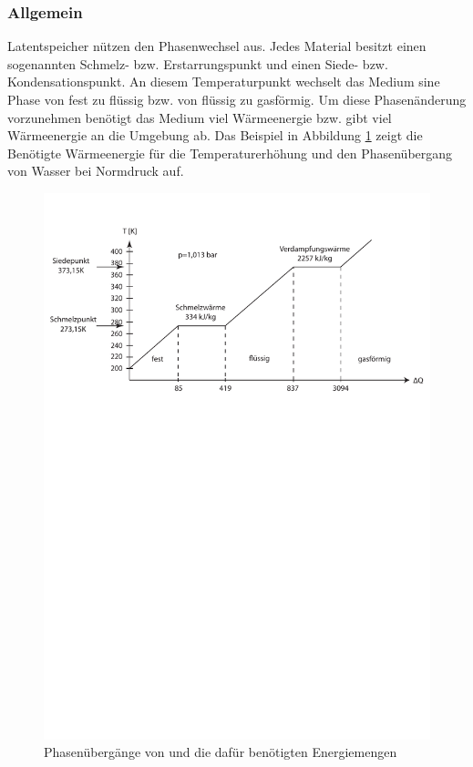 \documentclass[11pt,a4paper]{scrartcl}
\begin{document}
\subsubsection{Allgemein}
Latentspeicher nützen den Phasenwechsel aus. Jedes Material besitzt einen
sogenannten Schmelz- bzw. Erstarrungspunkt und einen Siede- bzw.
Kondensationspunkt. An diesem Temperaturpunkt wechselt das Medium sine Phase von
fest zu flüssig bzw. von flüssig zu gasförmig. Um diese Phasenänderung
vorzunehmen benötigt das Medium viel Wärmeenergie bzw. gibt viel Wärmeenergie an
die Umgebung ab. Das Beispiel in Abbildung \ref{fig:H2O} zeigt die Benötigte
Wärmeenergie für die Temperaturerhöhung und den Phasenübergang von Wasser bei
Normdruck auf.

\begin{figure}[h!]
\begin{center}
\includegraphics[scale=0.6]{images/Phasendiagramm.pdf}
\caption{Phasenübergänge von  und die dafür benötigten Energiemengen}
\label{fig:H2O}
\end{center}
\end{figure}
\end{document}
